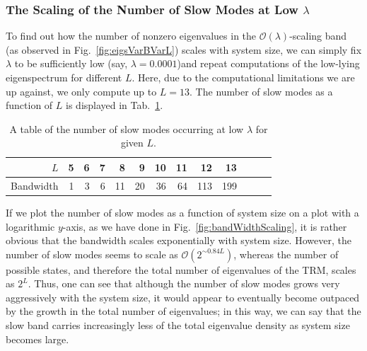 \subsubsection{The Scaling of the Number of Slow Modes at Low $\lambda$}
To find out how the number of nonzero eigenvalues in the $\mathcal{O}(\lambda)$-scaling
band (as observed in Fig.~\ref{fig:eigsVarBVarL}) scales with system size,
we can simply fix $\lambda$ to be sufficiently low (say, $\lambda=0.0001$)and repeat
computations of the low-lying eigenspectrum for different $L$. Here, due to the
computational limitations we are up against, we only compute up to $L=13$. The number
of slow modes as a function of $L$ is displayed in Tab.~\ref{tab:bandThickness}.
\begin{table} \caption[Tabulated values for the variation of the width of the slow band with
system size.]{A table of the number of slow modes occurring at low $\lambda$ for given 
$L$.}
\begin{tabular}{r || r | r | r | r | r | r | r | r | r | r | r | r} \label{tab:bandThickness}
 $L$ & 5 & 6 & 7 & 8 & 9 & 10 & 11 & 12 & 13 \\
 \hline
 Bandwidth & 1 & 3 & 6 & 11 & 20 & 36 & 64 & 113 & 199 \\
\end{tabular}
\end{table}
If we plot the number of slow modes as a function of system size on a plot with a 
logarithmic $y$-axis, as we have done in Fig.~\ref{fig:bandWidthScaling},
it is rather obvious that the bandwidth scales exponentially with system size.
However, the number of slow modes seems to scale as $\mathcal{O}(2^{\sim 0.84 L})$,
whereas the number of possible states, and therefore the total number of eigenvalues of
the TRM, scales as $2^L$. Thus, one can see that although the number of slow modes grows
very aggressively with the system size, it would appear to eventually become 
outpaced by the growth in the total number of eigenvalues; in this way, we can say that
the slow band carries increasingly less of the total eigenvalue density as system size
becomes large.
